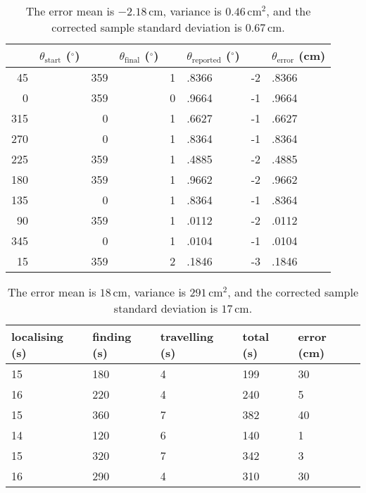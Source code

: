 \documentclass[twocolumn]{article}
\def\degree{\ensuremath{^\circ}}
\begin{document}
\begin{enumerate}
\begin{table*}[htb]
\begin{center}\begin{tabular}{r@{}l r@{}l r@{}l r@{}l}
&$\theta_{\text{start}}$ (\degree)& &$\theta_{\text{final}}$ (\degree)& &$\theta_{\text{reported}}$ (\degree)& &$\theta_{\text{error}}$ (cm) \\
\hline
45&& 359&& 1&.8366& -2&.8366 \\
0&& 359&& 0&.9664& -1&.9664 \\
315&& 0&& 1&.6627& -1&.6627 \\
270&& 0&& 1&.8364& -1&.8364 \\
225&& 359&& 1&.4885& -2&.4885 \\
180&& 359&& 1&.9662& -2&.9662 \\
135&& 0&& 1&.8364& -1&.8364 \\
90&& 359&& 1&.0112& -2&.0112 \\
345&& 0&& 1&.0104& -1&.0104 \\
15&& 359&& 2&.1846& -3&.1846 \\
\end{tabular}\end{center}
\caption{The error mean is $-2.18$\,cm, variance is %
$0.46$\,cm$^{2}$, and the corrected sample standard deviation is %
$0.67$\,cm.\cite{alexneil4}}
\label{open}
\end{table*}

\begin{table*}[htb]
\begin{center}\begin{tabular}{l l l l l}
localising (s) & finding (s) & travelling (s) & total (s) & error (cm)\\
\hline
15& 180& 4& 199& 30 \\
16& 220& 4& 240& 5 \\
15& 360& 7& 382& 40 \\
14& 120& 6& 140& 1 \\
15& 320& 7& 342& 3 \\
16& 290& 4& 310& 30 \\
\end{tabular}\end{center}
\caption{The error mean is $18$\,cm, variance is $291$\,cm$^{2}$, and the corrected sample standard deviation is $17$\,cm.}
\label{robot-wars}
\end{table*}

\end{enumerate}

\clearpage
\end{document}

